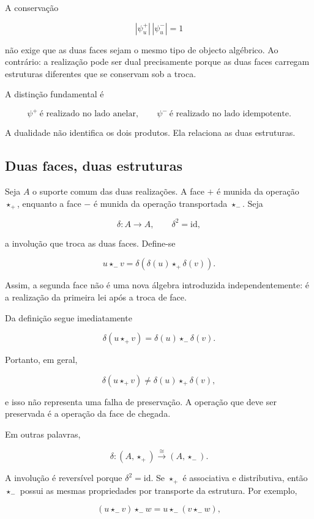 \documentclass[11pt,a4paper]{article}
\begin{document}
A conservação

$$
\boxed{|\psi_u^+|\,|\psi_u^-|=1}
$$

não exige que as duas faces sejam o mesmo tipo de objecto algébrico.
Ao contrário: a realização pode ser dual precisamente porque as duas faces
carregam estruturas diferentes que se conservam sob a troca.

A distinção fundamental é

$$
\boxed{
\psi^+\ \text{é realizado no lado anelar},
\qquad
\psi^-\ \text{é realizado no lado idempotente}.
}
$$

A dualidade não identifica os dois produtos. Ela relaciona as duas estruturas.

\subsection{Duas faces, duas estruturas}

Seja \(A\) o suporte comum das duas realizações. A face \(+\) é
munida da operação \(\star_+\), enquanto a face \(-\) é munida da
operação transportada \(\star_-\). Seja

$$
\delta:A\to A,\qquad \delta^2=\mathrm{id},
$$

a involução que troca as duas faces. Define-se

$$
\boxed{
 u\star_- v
=
\delta\!\left(\delta(u)\star_+\delta(v)\right).
}
$$

Assim, a segunda face não é uma nova álgebra introduzida
independentemente: é a realização da primeira lei após a troca de
face.

Da definição segue imediatamente

$$
\boxed{
\delta(u\star_+v)
=
\delta(u)\star_-\delta(v).
}
$$

Portanto, em geral,

$$
\delta(u\star_+v)
\neq
\delta(u)\star_+\delta(v),
$$

e isso não representa uma falha de preservação. A operação que deve ser
preservada é a operação da face de chegada.

Em outras palavras,

$$
\boxed{
\delta:(A,\star_+)\xrightarrow{\cong}(A,\star_-).
}
$$

A involução é reversível porque \(\delta^2=\mathrm{id}\). Se
\(\star_+\) é associativa e distributiva, então \(\star_-\) possui as
mesmas propriedades por transporte da estrutura. Por exemplo,

$$
(u\star_-v)\star_-w
=
 u\star_-(v\star_-w),
$$
\end{document}
